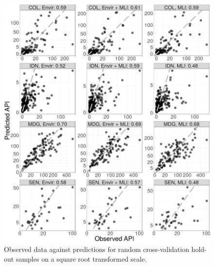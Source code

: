 \documentclass[review]{elsarticle}
\begin{document}
\begin{figure}
  \includegraphics[width=\textwidth]{figs/cv1_l_scatter.png}
\caption{
  Observed data against predictions for random cross-validation hold-out samples on a square root transformed scale.
}
\label{f:scatter1}
\end{figure}
\end{document}

